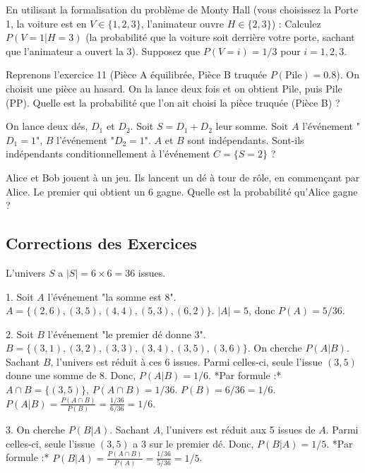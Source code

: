 \begin{exercicebox}
En utilisant la formalisation du problème de Monty Hall (vous choisissez la Porte 1, la voiture est en $V \in \{1, 2, 3\}$, l'animateur ouvre $H \in \{2, 3\}$) :
Calculez $P(V=1 | H=3)$ (la probabilité que la voiture soit derrière votre porte, sachant que l'animateur a ouvert la 3). Supposez que $P(V=i)=1/3$ pour $i=1,2,3$.
\end{exercicebox}

\begin{exercicebox}
Reprenons l'exercice 11 (Pièce A équilibrée, Pièce B truquée $P(\text{Pile})=0.8$).
On choisit une pièce au hasard. On la lance deux fois et on obtient Pile, puis Pile (PP).
Quelle est la probabilité que l'on ait choisi la pièce truquée (Pièce B) ?
\end{exercicebox}

\begin{exercicebox}
On lance deux dés, $D_1$ et $D_2$. Soit $S = D_1 + D_2$ leur somme.
Soit $A$ l'événement "$D_1 = 1$", $B$ l'événement "$D_2 = 1$".
$A$ et $B$ sont indépendants. Sont-ils indépendants conditionnellement à l'événement $C = \{S = 2\}$ ?
\end{exercicebox}

\begin{exercicebox}
Alice et Bob jouent à un jeu. Ils lancent un dé à tour de rôle, en commençant par Alice. Le premier qui obtient un 6 gagne.
Quelle est la probabilité qu'Alice gagne ?
\end{exercicebox}

\subsection{Corrections des Exercices}


\begin{correctionbox}
L'univers $S$ a $|S| = 6 \times 6 = 36$ issues.

1.  Soit $A$ l'événement "la somme est 8". $A = \{(2,6), (3,5), (4,4), (5,3), (6,2)\}$.
    $|A|=5$, donc $P(A) = 5/36$.

2.  Soit $B$ l'événement "le premier dé donne 3". $B = \{(3,1), (3,2), (3,3), (3,4), (3,5), (3,6)\}$.
    On cherche $P(A|B)$. Sachant $B$, l'univers est réduit à ces 6 issues. Parmi celles-ci, seule l'issue $(3,5)$ donne une somme de 8.
    Donc, $P(A|B) = 1/6$.
    *Par formule :* $A \cap B = \{(3,5)\}$, $P(A \cap B) = 1/36$. $P(B) = 6/36 = 1/6$.
    $P(A|B) = \frac{P(A \cap B)}{P(B)} = \frac{1/36}{6/36} = 1/6$.

3.  On cherche $P(B|A)$. Sachant $A$, l'univers est réduit aux 5 issues de $A$. Parmi celles-ci, seule l'issue $(3,5)$ a 3 sur le premier dé.
    Donc, $P(B|A) = 1/5$.
    *Par formule :* $P(B|A) = \frac{P(A \cap B)}{P(A)} = \frac{1/36}{5/36} = 1/5$.
\end{correctionbox}

